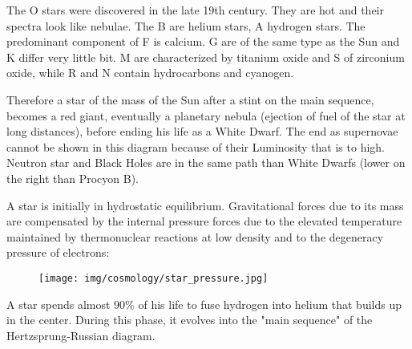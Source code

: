 	The O stars were discovered in the late 19th century. They are hot and their spectra look like nebulae. The B are helium stars, A hydrogen stars. The predominant component of F is calcium. G are of the same type as the Sun and K differ very little bit. M are characterized by titanium oxide and S of zirconium oxide, while R and N contain hydrocarbons and cyanogen.
	
	Therefore a star of the mass of the Sun after a stint on the main sequence, becomes a red giant, eventually a planetary nebula (ejection of fuel of the star at long distances), before ending his life as a White Dwarf. The end as supernovae cannot be shown in this diagram because of their Luminosity that is to high. Neutron star and Black Holes are in the same path than White Dwarfs (lower on the right than Procyon B).
	
	A star is initially in hydrostatic equilibrium. Gravitational forces due to its mass are compensated by the internal pressure forces due to the elevated temperature maintained by thermonuclear reactions at low density and to the degeneracy pressure of electrons: 
	\begin{figure}[H]
		\centering
		\texttt{[image: img/cosmology/star\_pressure.jpg]}
	\end{figure}	
	A star spends almost $90\%$ of his life to fuse hydrogen into helium that builds up in the center. During this phase, it evolves into the "main sequence" of the Hertzsprung-Russian diagram.
	
